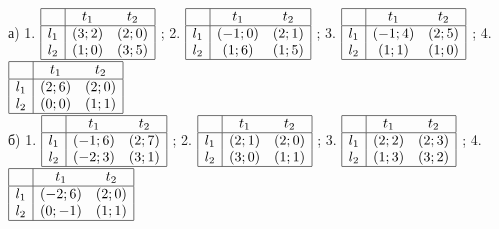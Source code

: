 \begin{problem}
а)	1.  $\begin{array}{|c|cc|}  \hline {} & {t_{1} } & {t_{2} } \\  \hline {l_{1} } & {\left(3;2\right)} & {\left(2;0\right)} \\ {l_{2} } & {\left(1;0\right)} & {\left(3;5\right)} \\  \hline  \end{array}$ ; 2.  $\begin{array}{|c|cc|}  \hline {} & {t_{1} } & {t_{2} } \\  \hline {l_{1} } & {\left(-1;0\right)} & {\left(2;1\right)} \\ {l_{2} } & {\left(1;6\right)} & {\left(1;5\right)} \\  \hline  \end{array}$ ; 3.  $\begin{array}{|c|cc|}  \hline {} & {t_{1} } & {t_{2} } \\  \hline {l_{1} } & {\left(-1;4\right)} & {\left(2;5\right)} \\ {l_{2} } & {\left(1;1\right)} & {\left(1;0\right)} \\  \hline  \end{array}$ ; 4.  $\begin{array}{|c|cc|}  \hline {} & {t_{1} } & {t_{2} } \\  \hline {l_{1} } & {\left(2;6\right)} & {\left(2;0\right)} \\ {l_{2} } & {\left(0;0\right)} & {\left(1;1\right)} \\  \hline  \end{array}$ \\
б)	1.  $\begin{array}{|c|cc|}  \hline {} & {t_{1} } & {t_{2} } \\  \hline {l_{1} } & {\left(-1;6\right)} & {\left(2;7\right)} \\ {l_{2} } & {\left(-2;3\right)} & {\left(3;1\right)} \\  \hline  \end{array}$ ; 2.  $\begin{array}{|c|cc|}  \hline {} & {t_{1} } & {t_{2} } \\  \hline {l_{1} } & {\left(2;1\right)} & {\left(2;0\right)} \\ {l_{2} } & {\left(3;0\right)} & {\left(1;1\right)} \\  \hline  \end{array}$ ; 3.  $\begin{array}{|c|cc|}  \hline {} & {t_{1} } & {t_{2} } \\  \hline {l_{1} } & {\left(2;2\right)} & {\left(2;3\right)} \\ {l_{2} } & {\left(1;3\right)} & {\left(3;2\right)} \\  \hline  \end{array}$ ; 4.  $\begin{array}{|c|cc|}  \hline {} & {t_{1} } & {t_{2} } \\  \hline {l_{1} } & {\left(-2;6\right)} & {\left(2;0\right)} \\ {l_{2} } & {\left(0;-1\right)} & {\left(1;1\right)} \\  \hline  \end{array}$ \\

\end{problem}
